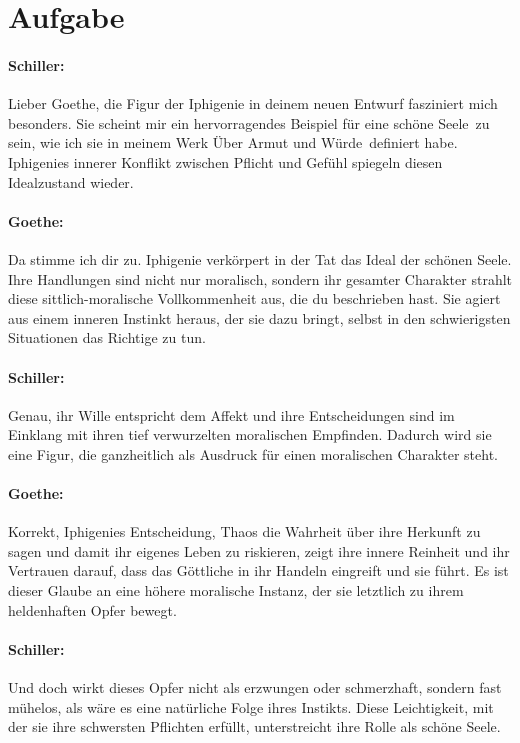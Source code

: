 \documentclass[12pt,a4paper]{report}
\begin{document}
	\setcounter{section}{1}
	\section{Aufgabe}
	
	\paragraph{Schiller:} 
	Lieber Goethe, die Figur der Iphigenie in deinem neuen Entwurf fasziniert mich besonders.
	Sie scheint mir ein hervorragendes Beispiel für eine \dq schöne Seele\dq\ zu sein, wie ich sie in meinem Werk \dq Über Armut und Würde\dq\ definiert habe.
	Iphigenies innerer Konflikt zwischen Pflicht und Gefühl spiegeln diesen Idealzustand wieder.

	\paragraph{Goethe:}
	Da stimme ich dir zu.
	Iphigenie verkörpert in der Tat das Ideal der \dq schönen Seele\dq.
	Ihre Handlungen sind nicht nur moralisch, sondern ihr gesamter Charakter strahlt diese sittlich-moralische Vollkommenheit aus, die du beschrieben hast.
	Sie agiert aus einem inneren Instinkt heraus, der sie dazu bringt, selbst in den schwierigsten Situationen das Richtige zu tun.
	
	\paragraph{Schiller:}
	Genau, ihr Wille entspricht dem Affekt und ihre Entscheidungen sind im Einklang mit ihren tief verwurzelten moralischen Empfinden.
	Dadurch wird sie eine Figur, die ganzheitlich als Ausdruck für einen moralischen Charakter steht.
	
	\paragraph{Goethe:}
	Korrekt, Iphigenies Entscheidung, Thaos die Wahrheit über ihre Herkunft zu sagen und damit ihr eigenes Leben zu riskieren, zeigt ihre innere Reinheit und ihr Vertrauen darauf, dass das Göttliche in ihr Handeln eingreift und sie führt.
	Es ist dieser Glaube an eine höhere moralische Instanz, der sie letztlich zu ihrem heldenhaften Opfer bewegt.
	
	\paragraph{Schiller:}
	Und doch wirkt dieses Opfer nicht als erzwungen oder schmerzhaft, sondern fast mühelos, als wäre es eine natürliche Folge ihres Instikts.
	Diese Leichtigkeit, mit der sie ihre schwersten Pflichten erfüllt, unterstreicht ihre Rolle als \dq schöne Seele\dq.
\end{document}
